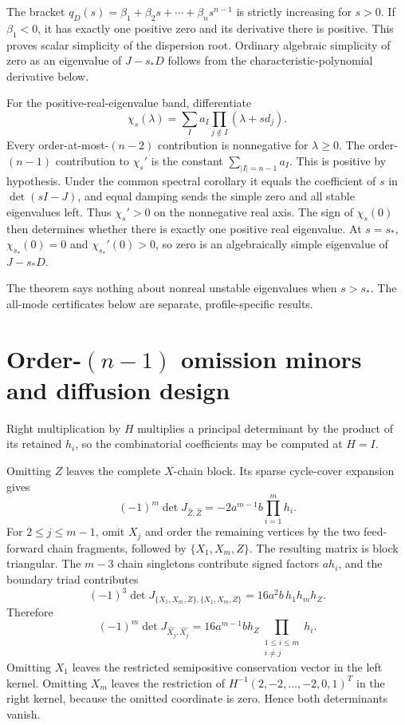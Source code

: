\documentclass[10pt]{article}
\newcommand{\1}{\mathbf1}
\begin{document}
The bracket $q_D(s)=\beta_1+\beta_2s+\cdots+\beta_ns^{n-1}$ is strictly
increasing for $s>0$.  If $\beta_1<0$, it has exactly one positive zero and
its derivative there is positive.  This proves scalar simplicity of the
dispersion root.  Ordinary algebraic simplicity of zero as an eigenvalue of
$J-s_*D$ follows from the characteristic-polynomial derivative below.

For the positive-real-eigenvalue band, differentiate
\[
 \chi_s(\lambda)=\sum_Ia_I\prod_{j\notin I}(\lambda+sd_j).
\]
Every order-at-most-$(n-2)$ contribution is nonnegative for $\lambda\ge0$.
The order-$(n-1)$ contribution to $\chi_s'$ is the constant
$\sum_{|I|=n-1}a_I$.  This is positive by hypothesis.  Under the common spectral corollary it equals the coefficient of $s$ in $\det(sI-J)$, and equal damping sends the simple zero and all stable eigenvalues left.  Thus $\chi_s'>0$ on the
nonnegative real axis.  The sign of $\chi_s(0)$ then determines whether there
is exactly one positive real eigenvalue.  At $s=s_*$,
$\chi_{s_*}(0)=0$ and $\chi_{s_*}'(0)>0$, so zero is an algebraically simple
eigenvalue of $J-s_*D$.

The theorem says nothing about nonreal unstable eigenvalues when $s>s_*$.
The all-mode certificates below are separate, profile-specific results.

\section{Order-\texorpdfstring{$(n-1)$}{(n-1)} omission minors and diffusion design}

Right multiplication by $H$ multiplies a principal determinant by the product
of its retained $h_i$, so the combinatorial coefficients may be computed at
$H=I$.

Omitting $Z$ leaves the complete $X$-chain block.  Its sparse cycle-cover
expansion gives
\[
 (-1)^m\det J_{\widehat Z,\widehat Z}
 =-2a^{m-1}b\prod_{i=1}^mh_i.
\]
For $2\le j\le m-1$, omit $X_j$ and order the remaining vertices by the two
feed-forward chain fragments, followed by $\{X_1,X_m,Z\}$.  The resulting
matrix is block triangular.  The $m-3$ chain singletons contribute signed
factors $a h_i$, and the boundary triad contributes
\[
 (-1)^3\det J_{\{X_1,X_m,Z\},\{X_1,X_m,Z\}}
 =16a^2b\,h_1h_mh_Z.
\]
Therefore
\[
 (-1)^m\det J_{\widehat{X_j},\widehat{X_j}}
 =16a^{m-1}bh_Z\prod_{\substack{1\le i\le m\\i\ne j}}h_i.
\]
Omitting $X_1$ leaves the restricted semipositive conservation vector in the
left kernel.  Omitting $X_m$ leaves the restriction of
$H^{-1}(2,-2,\ldots,-2,0,1)^T$ in the right kernel, because the omitted
coordinate is zero.  Hence both determinants vanish.
\end{document}
